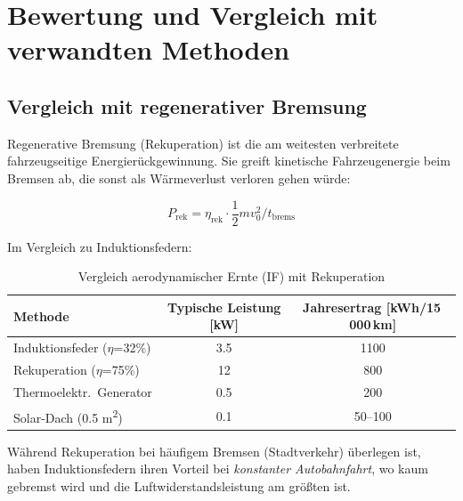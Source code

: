 ﻿\documentclass[12pt, a4paper]{report}
\theoremstyle{definition}
\theoremstyle{remark}
\begin{document}
\chapter{Bewertung und Vergleich mit verwandten Methoden}
\label{chap:vergleich}

\section{Vergleich mit regenerativer Bremsung}

Regenerative Bremsung (Rekuperation) ist die am weitesten verbreitete
fahrzeugseitige Energierückgewinnung. Sie greift kinetische Fahrzeugenergie
beim Bremsen ab, die sonst als Wärmeverlust verloren gehen würde:

\begin{equation}
  P_{\text{rek}} = \eta_{\text{rek}} \cdot \frac{1}{2}mv_0^2 / t_{\text{brems}}
  \label{eq:p_rek}
\end{equation}

Im Vergleich zu Induktionsfedern:

\begin{table}[H]
  \centering
  \caption{Vergleich aerodynamischer Ernte (IF) mit Rekuperation}
  \label{tab:vergleich_rek}
  \begin{tabular}{lSS}
    \toprule
    Methode & {Typische Leistung [kW]} & {Jahresertrag [kWh/15\,000\,km]} \\
    \midrule
    Induktionsfeder ($\eta$=32\%) & 3.5 & 1100 \\
    Rekuperation ($\eta$=75\%)    & 12  & 800 \\
    Thermoelektr.\ Generator & 0.5 & 200 \\
    Solar-Dach (0.5 m\textsuperscript{2})      & 0.1 & {50--100} \\
    \bottomrule
  \end{tabular}
\end{table}

Während Rekuperation bei häufigem Bremsen (Stadtverkehr) überlegen ist,
haben Induktionsfedern ihren Vorteil bei \emph{konstanter Autobahnfahrt},
wo kaum gebremst wird und die Luftwiderstandsleistung am größten ist.
\end{document}
